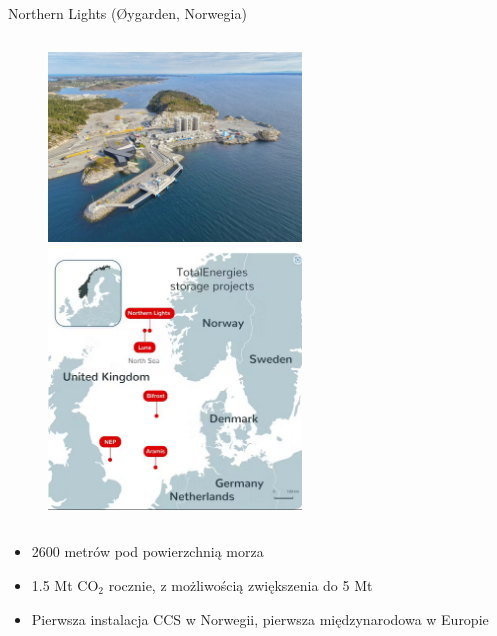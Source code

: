 \begin{columnframe}{Northern Lights (Øygarden, Norwegia)}
    \begin{column}{0.5\textwidth}
        \begin{figure}
            \centering
            \includegraphics[width=0.6\textwidth, frame]{images/northern_lights.jpeg}
            \includegraphics[width=0.6\textwidth, frame]{images/northern_lights_map.png}
        \end{figure}
    \end{column}
    \begin{column}{0.5\textwidth}
        \begin{itemize}
            \item 2600 metrów pod powierzchnią morza
            \item 1.5 Mt CO$_2$ rocznie, z możliwością zwiększenia do 5 Mt
            \item Pierwsza instalacja CCS w Norwegii, pierwsza międzynarodowa w Europie
        \end{itemize}
    \end{column}
\end{columnframe}
